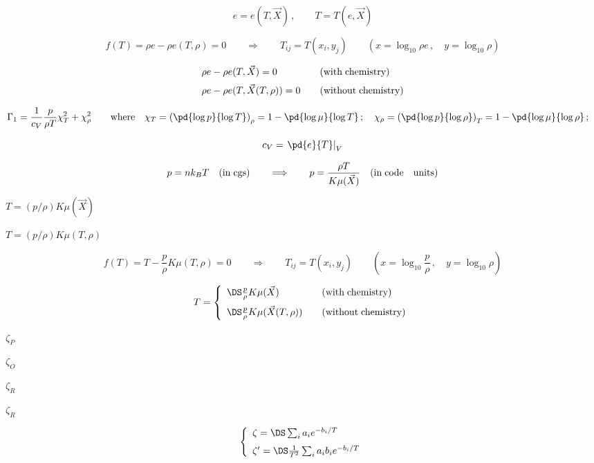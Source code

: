 \documentclass{article}
\begin{document}
\[
     e = e(T,\vec{X})\,,\qquad
     T = T(e,\vec{X})
\]
\pagebreak

\[
  f(T) = \rho e - \rho e(T,\rho) = 0
  \qquad\Longrightarrow\qquad
  T_{ij} = T(x_i, y_j) \qquad
  \left(x=\log_{10}\rho e\,,\quad y=\log_{10}\rho\right)
\]
\pagebreak

\[
   \begin{array}{ll}
    \rho e - \rho e(T,\vec{X}) = 0  & \quad{(\rm with\; chemistry)}
          \\ \noalign{\medskip}
    \rho e - \rho e(T,\vec{X}(T,\rho)) = 0 & \quad{(\rm without\; chemistry)}
       \end{array}
\]
\pagebreak

\[
    \Gamma_1 = \frac{1}{c_V}\frac{p}{\rho T} \chi_T^2 + \chi_\rho^2
    \qquad{\rm where}\quad
    \chi_T = \left(\pd{\log p}{\log T}\right)_{\rho} = 
             1 - \pd{\log{\mu}}{\log T} \,;\quad
    \chi_\rho = \left(\pd{\log p}{\log\rho}\right)_{T} = 
                 1 - \pd{\log{\mu}}{\log\rho} \,;\quad
 \]
\pagebreak

\[
     c_V = \left.\pd{e}{T}\right|_V
 \]
\pagebreak

\[
     p = nk_BT \quad {\rm(in\; cgs)} 
     \qquad \Longrightarrow\qquad
     p = \frac{\rho T}{K\mu(\vec{X})} \quad {\rm(in\; code\quad units)} 
\]
\pagebreak

$ T=(p/\rho) K\mu(\vec{X})$
\pagebreak

$T = (p/\rho) K \mu(T,\rho)$
\pagebreak

\[
  f(T) = T - \frac{p}{\rho} K\mu(T,\rho) = 0
  \qquad\Longrightarrow\qquad
  T_{ij} = T(x_i, y_j) \qquad
  \left(x=\log_{10}\frac{p}{\rho}\,,\quad y=\log_{10}\rho\right)
\]
\pagebreak

\[
   T = \left\{\begin{array}{ll}
       \DS \frac{p}{\rho} K \mu(\vec{X}) &\quad{(\rm with\; chemistry)}
          \\ \noalign{\medskip}
       \DS \frac{p}{\rho}K\mu(\vec{X}(T,\rho)) & \quad{(\rm without\; chemistry)}
       \end{array}\right.
\]
\pagebreak

$ \zeta_P$
\pagebreak

$ \zeta_O$
\pagebreak

$\zeta_R$
\pagebreak

$ \zeta_R$
\pagebreak

\[ 
  \left\{\begin{array}{l}
    \zeta  = \DS \sum_i a_ie^{-b_i/T} \\ \noalign{\medskip}
    \zeta' = \DS \frac{1}{T^2}\sum_i a_ib_ie^{-b_i/T} 
  \end{array}\right.
\]
\pagebreak
\end{document}
